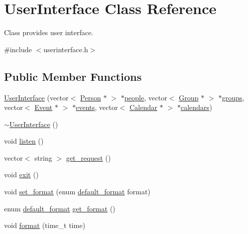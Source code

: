 \hypertarget{classUserInterface}{
\section{UserInterface Class Reference}
\label{df/de1/classUserInterface}
}


Class provides user interface.  




{\ttfamily \#include $<$userinterface.h$>$}

\subsection*{Public Member Functions}
\begin{DoxyCompactItemize}
\item 
\hyperlink{classUserInterface_a72d625f6d41876d679ed067e0f273ed8}{UserInterface} (vector$<$ \hyperlink{classPerson}{Person} $\ast$ $>$ $\ast$\hyperlink{classUserInterface_a3d0914e9d2ba661bc3691397c695287e}{people}, vector$<$ \hyperlink{classGroup}{Group} $\ast$ $>$ $\ast$\hyperlink{classUserInterface_a12676e629660c43c63eb5b01c5c19bc3}{groups}, vector$<$ \hyperlink{classEvent}{Event} $\ast$ $>$ $\ast$\hyperlink{classUserInterface_ae3370dc0d02c19b4b1cc7c47221c2bfa}{events}, vector$<$ \hyperlink{classCalendar}{Calendar} $\ast$ $>$ $\ast$\hyperlink{classUserInterface_abd1f3233d3e666415f6cdf8458b50faa}{calendars})
\item 
\hyperlink{classUserInterface_ae588b2ff1711a016dd4c6fc5002c0841}{$\sim$UserInterface} ()
\item 
void \hyperlink{classUserInterface_ac1cead6c14db26f88802ea035fb59bd9}{listen} ()
\item 
vector$<$ string $>$ \hyperlink{classUserInterface_a22fa7e60f82f12920e1627c862f6532e}{get\_\-request} ()
\item 
void \hyperlink{classUserInterface_a396eb29856a6afc91bc0e0eef1de2df7}{exit} ()
\item 
void \hyperlink{classUserInterface_a36513fcf018fafc53726cf610f46571f}{set\_\-format} (enum \hyperlink{userinterface_8h_a5a0e707f53d6c5632b2fb5ffd2d22a11}{default\_\-format} format)
\item 
enum \hyperlink{userinterface_8h_a5a0e707f53d6c5632b2fb5ffd2d22a11}{default\_\-format} \hyperlink{classUserInterface_ad543750a7accc0c4825e02a93fda1909}{get\_\-format} ()
\item 
void \hyperlink{classUserInterface_a9373bc1aedbdc68905942bcb7c6a8fd3}{format} (time\_\-t time)

\end{DoxyCompactItemize}

